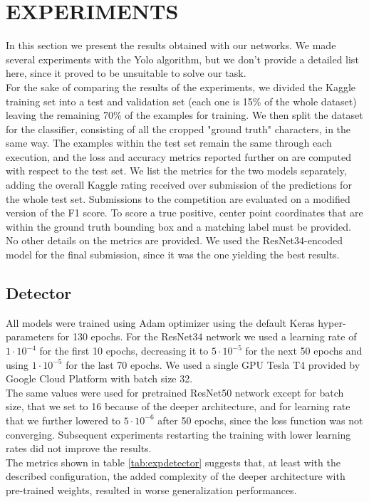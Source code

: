 \section{EXPERIMENTS}
\label{sec:experiments}
In this section we present the results obtained with our networks. We made several experiments with the Yolo algorithm, but we don't provide a detailed list here, since it proved to be unsuitable to solve our task.\\ 
For the sake of comparing the results of the experiments, we divided the Kaggle training set into a test and validation set (each one is 15\% of the whole dataset) leaving the remaining 70\% of the examples for training. We then split the dataset for the classifier, consisting of all the cropped "ground truth" characters, in the same way. The examples within the test set remain the same through each execution, and the loss and accuracy metrics reported further on are computed with respect to the test set. We list the metrics for the two models separately, adding the overall Kaggle rating received over submission of the predictions for the whole test set. Submissions to the competition are evaluated on a modified version of the F1 score. To score a true positive, center point coordinates that are within the ground truth bounding box and a matching label must be provided. No other details on the metrics are provided. We used the ResNet34-encoded model for the final submission, since it was the one yielding the best results.

\subsection{Detector}
\label{ssec:detectorexp}

All models were trained using Adam optimizer using the default Keras hyper-parameters for 130 epochs. For the ResNet34 network we used a learning rate of $1 \cdot 10^{-4}$ for the first 10 epochs, decreasing it to $5 \cdot 10^{-5}$ for the next 50 epochs and using $1 \cdot 10^{-5}$ for the last 70 epochs. We used a single GPU Tesla T4 provided by Google Cloud Platform with batch size 32.\\
The same values were used for pretrained ResNet50 network except for batch size, that we set to 16 because of the deeper architecture, and for learning rate that we further lowered to $5 \cdot 10^{-6}$ after 50 epochs, since the loss function was not converging. Subsequent experiments restarting the training with lower learning rates did not improve the results.\\
The metrics shown in table \ref{tab:expdetector} suggests that, at least with the described configuration, the added complexity of the deeper architecture with pre-trained weights, resulted in worse generalization performances.

